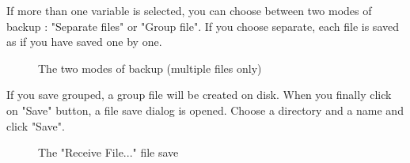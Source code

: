 \documentclass[10pt]{report}
\begin{document}
If more than one variable is selected, you can choose between two modes of backup :
"Separate files" or "Group file".\newline
If you choose separate, each file is saved as if you have saved one by one.\newline
\begin{figure}[H]
\centering
{}
\caption{The two modes of backup (multiple files only)}
\end{figure}
If you save grouped, a group file will be created on disk.\newline
When you finally click on "Save" button, a file save dialog is opened.\newline
Choose a directory and a name and click "Save".\newline
\begin{figure}[H]
\centering
{}
\caption{The "Receive File..." file save}
\end{figure}
\end{document}
